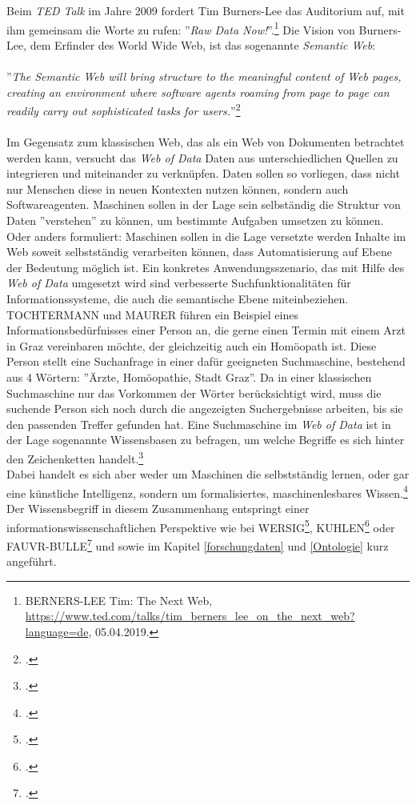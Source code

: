 \documentclass[12pt,a4paper]{article}
\begin{document}
Beim \textit{TED Talk} im Jahre 2009 fordert Tim Burners-Lee das Auditorium auf, mit ihm gemeinsam die Worte zu rufen: ''\textit{Raw Data Now!}''.\footnote{BERNERS-LEE Tim: The Next Web, \url{https://www.ted.com/talks/tim_berners_lee_on_the_next_web?language=de}, 05.04.2019.} Die Vision von Burners-Lee, dem Erfinder des World Wide Web, ist das sogenannte \textit{Semantic Web}:
\\
\\
''\textit{The Semantic Web will bring structure to the meaningful content of Web pages, creating an environment where software agents roaming from page to page can readily carry out sophisticated tasks for users.}''\footcite[][S.3]{berners2001semantic}
\\
\\
Im Gegensatz zum klassischen Web, das als ein Web von Dokumenten betrachtet werden kann, versucht das \textit{Web of Data} Daten aus unterschiedlichen Quellen zu integrieren und miteinander zu verknüpfen. Daten sollen so vorliegen, dass nicht nur Menschen diese in neuen Kontexten nutzen können, sondern auch Softwareagenten. Maschinen sollen in der Lage sein selbständig die Struktur von Daten ''verstehen'' zu können, um bestimmte Aufgaben umsetzen zu können. Oder anders formuliert: Maschinen sollen in die Lage versetzte werden Inhalte im Web soweit selbstständig verarbeiten können, dass Automatisierung auf Ebene der Bedeutung möglich ist. Ein konkretes Anwendungsszenario, das mit Hilfe des \textit{Web of Data} umgesetzt wird sind verbesserte Suchfunktionalitäten für Informationssysteme, die auch die semantische Ebene miteinbeziehen. TOCHTERMANN und MAURER führen ein Beispiel eines Informationsbedürfnisses einer Person an, die gerne einen Termin mit einem Arzt in Graz vereinbaren möchte, der gleichzeitig auch ein Homöopath ist. Diese Person stellt eine Suchanfrage in einer dafür geeigneten Suchmaschine, bestehend aus 4 Wörtern: ''Ärzte, Homöopathie, Stadt Graz''. Da in einer klassischen Suchmaschine nur das Vorkommen der Wörter berücksichtigt wird, muss die suchende Person sich noch durch die angezeigten Suchergebnisse arbeiten, bis sie den passenden Treffer gefunden hat. Eine Suchmaschine im \textit{Web of Data} ist in der Lage sogenannte Wissensbasen zu befragen, um welche Begriffe es sich hinter den Zeichenketten handelt.\footcite[S.1-2]{pellegrini2006semantic} 
\\
Dabei handelt es sich aber weder um Maschinen die selbstständig lernen, oder gar eine künstliche Intelligenz, sondern um formalisiertes, maschinenlesbares Wissen.\footcite[S.1-6]{pellegrini2006semantic} Der Wissensbegriff in diesem Zusammenhang entspringt einer informationswissenschaftlichen Perspektive wie bei WERSIG\footcite{wersig1971information}, KUHLEN\footcite{weller2013InformationBand} oder FAUVR-BULLE\footcite{favre2001information} und sowie im Kapitel \ref{forschungdaten} und \ref{Ontologie} kurz angeführt.
\end{document}
